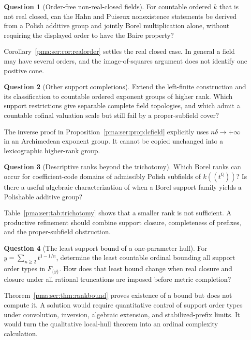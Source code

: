 \documentclass[11pt]{article}
\numberwithin{equation}{section}
\theoremstyle{definition}
\newtheorem{question}[question]{Question}
\theoremstyle{remark}
\newcommand{\Q}{\mathbb Q}
\begin{document}
\begin{question}[Order-free non-real-closed fields]
For countable ordered $k$ that is not real closed, can the Hahn and Puiseux
nonexistence statements be derived from a Polish additive group and jointly
Borel multiplication alone, without requiring the displayed order to have the
Baire property?
\end{question}
Corollary~\ref{pma:ser:cor:realorder} settles the real closed case. In general a field
may have several orders, and the image-of-squares argument does not identify
one positive cone.

\begin{question}[Other support completions]
Extend the left-finite construction and its classification to countable
ordered exponent groups of higher rank. Which support restrictions give
separable complete field topologies, and which admit a countable cofinal
valuation scale but still fail by a proper-subfield cover?
\end{question}
The inverse proof in Proposition~\ref{pma:ser:prop:lcfield} explicitly uses
$n\delta\to+\infty$ in an Archimedean exponent group. It cannot be copied
unchanged into a lexicographic higher-rank group.

\begin{question}[Descriptive ranks beyond the trichotomy]
Which Borel ranks can occur for coefficient-code domains of admissibly Polish
subfields of $k((t^\Q))$? Is there a useful algebraic characterization of
when a Borel support family yields a Polishable additive group?
\end{question}
Table~\ref{pma:ser:tab:trichotomy} shows that a smaller rank is not sufficient.
A productive refinement should combine support closure, completeness of
prefixes, and the proper-subfield obstruction.

\begin{question}[The least support bound of a one-parameter hull]
For $y=\sum_{n\geq2}t^{1-1/n}$, determine the least countable ordinal bounding
all support order types in $F_{\{y\}}$. How does that least bound change when
real closure and closure under all rational truncations are imposed before
metric completion?
\end{question}
Theorem~\ref{pma:ser:thm:rankbound} proves existence of a bound but does not compute
it. A solution would require quantitative control of support order types
under convolution, inversion, algebraic extension, and stabilized-prefix
limits. It would turn the qualitative local-hull theorem into an ordinal
complexity calculation.
\end{document}
